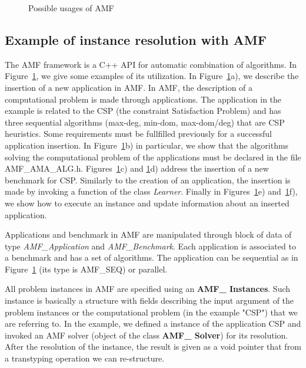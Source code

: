 \begin{figure}[htbp]
{\begin{minipage}{2.0in}
\begin{verbatim}
\end{verbatim}
\end{minipage}

}

\caption{Possible usages of AMF}
\label{AMF_ex1}
\end{figure}

\subsection{Example of instance resolution with AMF} \label{example}

The AMF framework is a C++ API for automatic combination of algorithms. In Figure~\ref{AMF_ex1}, we give some 
examples of its utilization. In Figure~\ref{AMF_ex1}a), we describe the insertion of a new application 
in AMF. In AMF, the description of a computational problem is made through applications. The application 
in the example is related to the CSP (the constraint Satisfaction Problem) and has three 
sequential algorithms (max-deg, min-dom, max-dom/deg) that are CSP heuristics. 
Some requirements must be fullfilled previously for a successful application insertion. In Figure~\ref{AMF_ex1}b) 
in particular, we show that the algorithms solving the computational problem of the applications must be declared 
in the file AMF\/\_AMA\_ALG.h. 
Figures~\ref{AMF_ex1}c) and \ref{AMF_ex1}d) address the insertion of a new benchmark for CSP. 
Similarly to the 
creation of an application, the insertion is made by invoking a function of the class \textit{Learner}. 
Finally in Figures~\ref{AMF_ex1}e) and~\ref{AMF_ex1}f), we show how to execute an instance 
and update information about an inserted application.

Applications and benchmark in AMF are manipulated through block of data of type \textit{AMF\_Application} and 
\textit{AMF\_Benchmark}. Each application is associated to a benchmark and has a set of algorithms. 
The application can be sequential as in Figure~\ref{AMF_ex1} (its type is AMF\_SEQ) or parallel.

All problem  instances in AMF are specified  using an \textbf{AMF\_ Instances}. Such instance is basically a structure 
with fields describing the input argument of the problem instances or the computational problem (in the example 
 "CSP") that we are referring to. In the example, we defined a instance of the application CSP and 
invoked an AMF solver (object of the class  \textbf{AMF\_ Solver}) for its resolution. After the resolution of 
the instance, the result is given as a void pointer that from a transtyping operation we can re-structure. 

